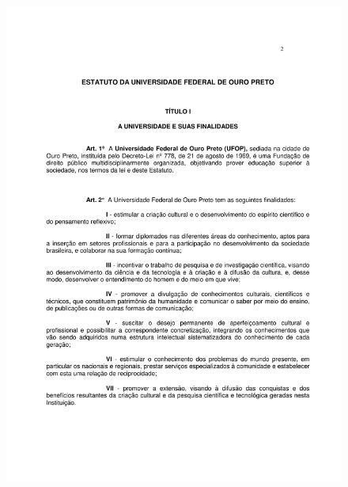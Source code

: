 \begin{figure}[p]
	\centering 
	\includegraphics[scale=0.7]{capitulos/resolucoes/cuni414/cuni414-2.pdf}
\end{figure}

